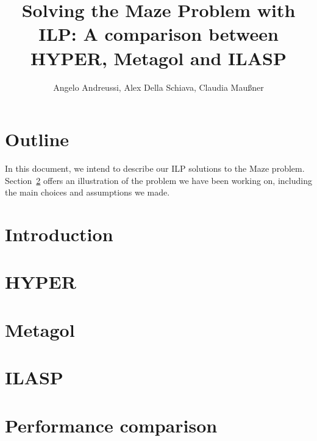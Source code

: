 \documentclass[12pt]{article}
\title{Solving the Maze Problem with ILP: A comparison between HYPER, Metagol and ILASP}
\author{Angelo Andreussi, Alex Della Schiava, Claudia Mau\ss ner}
\begin{document}
\maketitle

\section{Outline}
In this document, we intend to describe our ILP solutions to the Maze problem.\\
Section~\ref{sec:intro} offers an illustration of the problem we have been working on,
including the main choices and assumptions we made.
\section{Introduction}\label{sec:intro}
\section{HYPER}
\section{Metagol}
\section{ILASP}
\section{Performance comparison}
\end{document}

